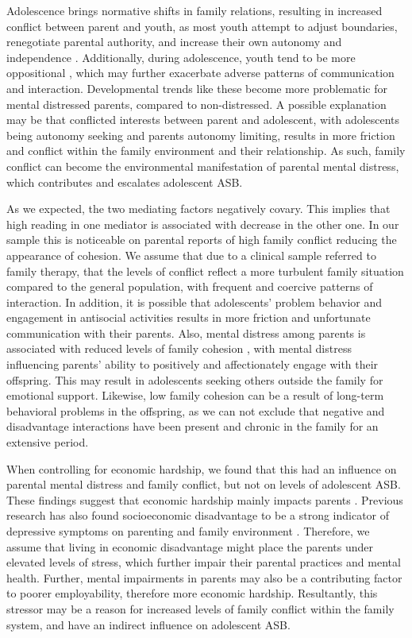 \documentclass{sn-jnl}                  %
\begin{document}
Adolescence brings normative shifts in family relations, resulting in increased conflict between parent and youth, as most youth attempt to adjust boundaries, renegotiate parental authority, and increase their own autonomy and independence \citep{weymouth:2016}. Additionally, during adolescence, youth tend to be more oppositional \citep{steinberg:2011}, which may further exacerbate adverse patterns of communication and interaction. Developmental trends like these become more problematic for mental distressed parents, compared to non-distressed. A possible explanation may be that conflicted interests between parent and adolescent, with adolescents being autonomy seeking and parents autonomy limiting, results in more friction and conflict within the family environment and their relationship. As such, family conflict can become the environmental manifestation of parental mental distress, which contributes and escalates  adolescent ASB.

As we expected, the two mediating factors negatively covary. This implies that high reading in one mediator is associated with decrease in the other one. In our sample this is noticeable on parental reports of high family conflict reducing the appearance of cohesion. We assume that due to a clinical sample referred to family therapy, that the levels of conflict reflect a more turbulent family situation compared to the general population, with frequent and coercive patterns of interaction. In addition, it is possible that adolescents' problem behavior and engagement in antisocial activities results in more friction and unfortunate communication with their parents. Also, mental distress among parents is associated with reduced levels of family cohesion \citep{perez:2018}, with mental distress influencing parents' ability to positively and affectionately engage with their offspring. This may result in adolescents seeking others outside the family for emotional support. Likewise, low family cohesion can be a result of long-term behavioral problems in the offspring, as we can not exclude that negative and disadvantage interactions have been present and chronic in the family for an extensive period.

When controlling for economic hardship, we found that this had an influence on parental mental distress and family conflict, but not on levels of adolescent ASB. These findings suggest that economic hardship mainly impacts parents . Previous research has also found socioeconomic disadvantage to be a strong indicator of depressive symptoms on parenting and family environment \citep{conger:2010, sturgeapple:2014, vreeland:2019}. Therefore, we assume that living in economic disadvantage might place the parents under elevated levels of stress, which further impair their parental practices and mental health. Further, mental impairments in parents may also be a contributing factor to poorer employability, therefore more economic hardship. Resultantly, this stressor may be a reason for increased levels of family conflict within the family system, and have an indirect influence on adolescent ASB.
\end{document}
